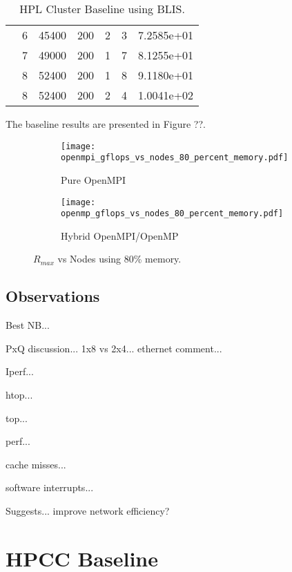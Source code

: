 \begin{table}
\begin{center}
\begin{tabular}{ |l|c|c|c|c|c|c| }
                & 6 & 45400 & 200 & 2 & 3 & 7.2585e+01 \\ 
                \cline{2-7} 
                & 7 & 49000 & 200 & 1 & 7 & 8.1255e+01 \\ 
                \cline{2-7} 
                & 8 & 52400 & 200 & 1 & 8 & 9.1180e+01 \\ 
                & 8 & 52400 & 200 & 2 & 4 & 1.0041e+02 \\ 
\hline
\end{tabular}
\end{center}
\caption{\label{tab:table-name}HPL Cluster Baseline using BLIS.}
\end{table}



The baseline results are presented in Figure ??.

\begin{figure}[H]
	\begin{subfigure}{1.0\textwidth}
		\centering
		\texttt{[image: openmpi\_gflops\_vs\_nodes\_80\_percent\_memory.pdf]}
		\caption{Pure OpenMPI}
		\label{fig:subim1}
	\end{subfigure}
	\par\bigskip
	\begin{subfigure}{1.0\textwidth}
		\centering
		\texttt{[image: openmp\_gflops\_vs\_nodes\_80\_percent\_memory.pdf]}
		\caption{Hybrid OpenMPI/OpenMP}
		\label{fig:subim2}
	\end{subfigure}
\caption{$R_{max}$ vs Nodes using 80\% memory.}
\label{fig:image2}
\end{figure}


%
%
\subsection{Observations}

Best NB...

PxQ discussion... 1x8 vs 2x4... ethernet comment...

Iperf...

htop...

top...

perf...

cache misses...

software interrupts...

Suggests... improve network efficiency?



%
%
\section{HPCC Baseline}

